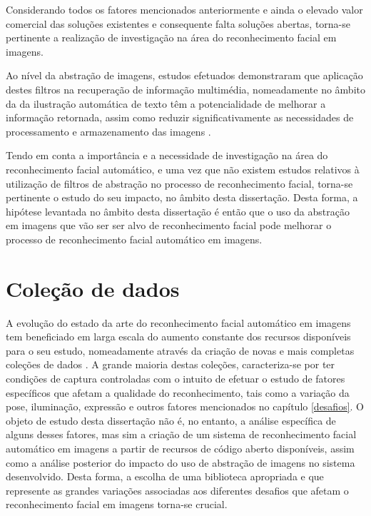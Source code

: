 Considerando todos os fatores mencionados anteriormente e ainda o elevado valor comercial das soluções existentes e consequente falta soluções abertas, torna-se pertinente a realização de investigação na área do reconhecimento facial em imagens. 

Ao nível da abstração de imagens, estudos efetuados demonstraram que aplicação destes filtros na recuperação de informação multimédia, nomeadamente no âmbito da da ilustração automática de texto têm a potencialidade de melhorar a informação retornada, assim como reduzir significativamente as necessidades de processamento e armazenamento das imagens \cite{Coelho:2012:IAC:2260641.2260676}. 

Tendo em conta a importância e a necessidade de investigação na área do reconhecimento facial automático, e uma vez que não existem estudos relativos à utilização de filtros de abstração no processo de reconhecimento facial, torna-se pertinente o estudo do seu impacto, no âmbito desta dissertação. Desta forma, a hipótese levantada no âmbito desta dissertação é então que o uso da abstração em imagens que vão ser ser alvo de reconhecimento facial pode melhorar o processo de reconhecimento facial automático em imagens.

\section{Coleção de dados} \label{sec:colecoes}

A evolução do estado da arte do reconhecimento facial automático em imagens tem beneficiado em larga escala do aumento constante dos recursos disponíveis para o seu estudo, nomeadamente através da criação de novas e mais completas coleções de dados \cite{Huang2007}. A grande maioria destas coleções, caracteriza-se por ter condições de captura controladas com o intuito de efetuar o estudo de fatores específicos que afetam a qualidade do reconhecimento, tais como a variação da pose, iluminação, expressão e outros fatores mencionados no capítulo \ref{desafios}. O objeto de estudo desta dissertação não é, no entanto, a análise específica de alguns desses fatores, mas sim a criação de um sistema de reconhecimento facial automático em imagens a partir de recursos de código aberto disponíveis, assim como a análise posterior do impacto do uso de abstração de imagens no sistema desenvolvido. Desta forma, a escolha de uma biblioteca apropriada e que represente as grandes variações associadas aos diferentes desafios que afetam o reconhecimento facial em imagens torna-se crucial.

